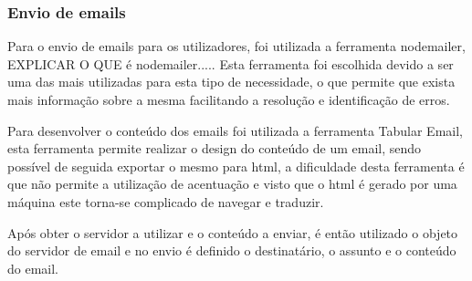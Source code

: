 \subsubsection{Envio de emails}
Para o envio de emails para os utilizadores, foi utilizada a ferramenta nodemailer, EXPLICAR O QUE é nodemailer..... Esta ferramenta foi escolhida devido a ser uma das mais utilizadas para esta tipo de necessidade, o que permite que exista mais informação sobre a mesma facilitando a resolução e identificação de erros. 

Para desenvolver o conteúdo dos emails foi utilizada a ferramenta Tabular Email, esta ferramenta permite realizar o design do conteúdo de um email, sendo possível de seguida exportar o mesmo para html, a dificuldade desta ferramenta é que não permite a utilização de acentuação e visto que o html é gerado por uma máquina este torna-se complicado de navegar e traduzir.

Após obter o servidor a utilizar e o conteúdo a enviar, é então utilizado o objeto do servidor de email e no envio é definido o destinatário, o assunto e o conteúdo do email.
